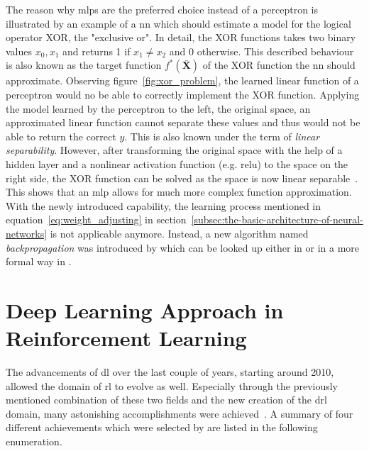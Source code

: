 \documentclass[draft,final]{vutinfth} %
\newcommand{\p}[1]{see p. #1}
\begin{document}
    \footnotetext{\cite[\p{168}]{goodfellow_deep_2016}}
    The reason why \glspl{mlp} are the preferred choice instead of a perceptron is illustrated by an example of a \gls{nn} which should estimate a model for the logical operator XOR, the "exclusive or".
    In detail, the XOR functions takes two binary values $x_0,x_1$ and returns 1 if $x_1 \neq x_2$ and 0 otherwise.
    This described behaviour is also known as the target function $f^*(\bar{\boldsymbol{X}})$ of the XOR function the \gls{nn} should approximate.
    Observing figure~\ref{fig:xor_problem}, the learned linear function of a perceptron would no be able to correctly implement the XOR function.
    Applying the model learned by the perceptron to the left, the original space, an approximated linear function cannot separate these values and thus would not be able to return the correct $y$.
    This is also known under the term of \textit{linear separability}.
    However, after transforming the original space with the help of a hidden layer and a nonlinear activation function (e.g. \gls{relu}) to the space on the right side, the XOR function can be solved as the space is now linear separable~\citep{goodfellow_deep_2016,aggarwal_neural_2018}.
    This shows that an \gls{mlp} allows for much more complex function approximation.
    With the newly introduced capability, the learning process mentioned in equation~\ref{eq:weight_adjusting} in section~\ref{subsec:the-basic-architecture-of-neural-networks} is not applicable anymore.
    Instead, a new algorithm named \textit{backpropagation} was introduced by \citeauthor{rumelhart_learning_1986} which can be looked up either in \citet[\p{21}]{aggarwal_neural_2018} or in a more formal way in \citet[\p{197}]{goodfellow_deep_2016}.




    \section{Deep Learning Approach in Reinforcement Learning}
    The advancements of \gls{dl} over the last couple of years, starting around 2010, allowed the domain of \gls{rl} to evolve as well.
    Especially through the previously mentioned combination of these two fields and the new creation of the \gls{drl} domain, many astonishing accomplishments were achieved~\citep{francois-lavet_introduction_2018}.
    A summary of four different achievements which were selected by \citeauthor{aggarwal_neural_2018} are listed in the following enumeration.
\end{document}
